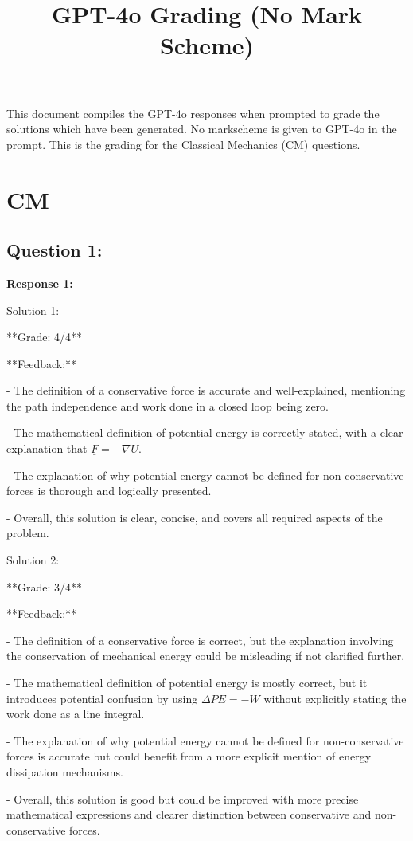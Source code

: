 \documentclass[a4paper,11pt]{article}
\title{GPT-4o Grading (No Mark Scheme)}
\begin{document}
\maketitle
This document compiles the GPT-4o responses when prompted to grade the solutions which have been generated. No markscheme is given to GPT-4o in the prompt. This is the grading for the Classical Mechanics (CM) questions. 

\section{CM}
\subsection*{Question 1:}

\textbf{Response 1:}

Solution 1:

**Grade: 4/4**

**Feedback:**

- The definition of a conservative force is accurate and well-explained, mentioning the path independence and work done in a closed loop being zero.

- The mathematical definition of potential energy is correctly stated, with a clear explanation that \( \underline{F} = -\nabla U \).

- The explanation of why potential energy cannot be defined for non-conservative forces is thorough and logically presented.

- Overall, this solution is clear, concise, and covers all required aspects of the problem.

Solution 2:

**Grade: 3/4**

**Feedback:**

- The definition of a conservative force is correct, but the explanation involving the conservation of mechanical energy could be misleading if not clarified further.

- The mathematical definition of potential energy is mostly correct, but it introduces potential confusion by using \(\Delta PE = -W\) without explicitly stating the work done as a line integral.

- The explanation of why potential energy cannot be defined for non-conservative forces is accurate but could benefit from a more explicit mention of energy dissipation mechanisms.

- Overall, this solution is good but could be improved with more precise mathematical expressions and clearer distinction between conservative and non-conservative forces.
\end{document}
